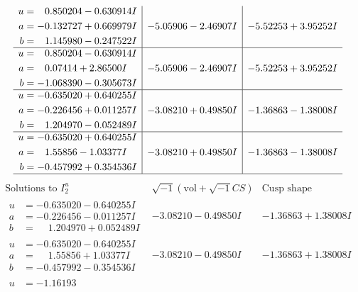 \documentclass[1p]{elsarticle_modified}
\theoremstyle{definition}
\newcommand{\I}{\sqrt{-1}}
\begin{document}
$$\begin{array}{c|c|c}
\begin{aligned}
u &= \phantom{-}0.850204 - 0.630914 I \\
a &= -0.132727 + 0.669979 I \\
b &= \phantom{-}1.145980 - 0.247522 I\end{aligned}
 & -5.05906 - 2.46907 I & -5.52253 + 3.95252 I \\ \hline\begin{aligned}
u &= \phantom{-}0.850204 - 0.630914 I \\
a &= \phantom{-}0.07414 + 2.86500 I \\
b &= -1.068390 - 0.305673 I\end{aligned}
 & -5.05906 - 2.46907 I & -5.52253 + 3.95252 I \\ \hline\begin{aligned}
u &= -0.635020 + 0.640255 I \\
a &= -0.226456 + 0.011257 I \\
b &= \phantom{-}1.204970 - 0.052489 I\end{aligned}
 & -3.08210 + 0.49850 I & -1.36863 - 1.38008 I \\ \hline\begin{aligned}
u &= -0.635020 + 0.640255 I \\
a &= \phantom{-}1.55856 - 1.03377 I \\
b &= -0.457992 + 0.354536 I\end{aligned}
 & -3.08210 + 0.49850 I & -1.36863 - 1.38008 I\\
 \hline 
 \end{array}$$\newpage$$\begin{array}{c|c|c}  
\text{Solutions to }I^u_{2}& \I (\text{vol} + \sqrt{-1}CS) & \text{Cusp shape}\\
 \hline 
\begin{aligned}
u &= -0.635020 - 0.640255 I \\
a &= -0.226456 - 0.011257 I \\
b &= \phantom{-}1.204970 + 0.052489 I\end{aligned}
 & -3.08210 - 0.49850 I & -1.36863 + 1.38008 I \\ \hline\begin{aligned}
u &= -0.635020 - 0.640255 I \\
a &= \phantom{-}1.55856 + 1.03377 I \\
b &= -0.457992 - 0.354536 I\end{aligned}
 & -3.08210 - 0.49850 I & -1.36863 + 1.38008 I \\ \hline\begin{aligned}
u &= -1.16193\phantom{ +0.000000I} \\

\end{aligned}
\end{array}$$
\end{document}
